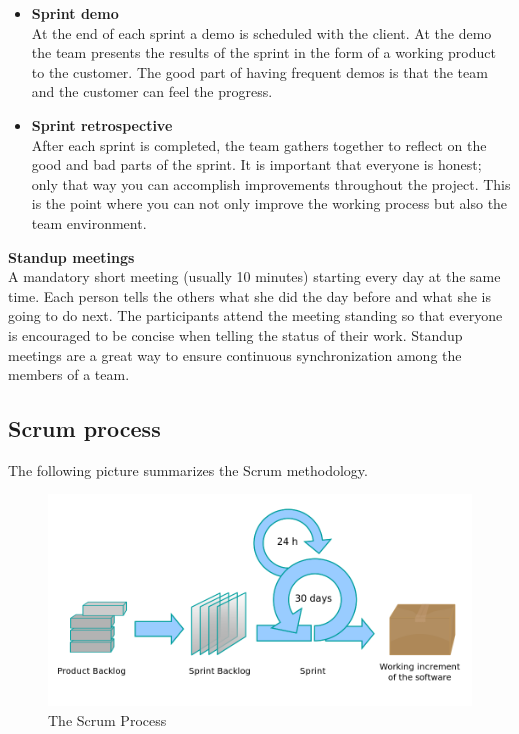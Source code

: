 \begin{itemize}
\item{\textbf{Sprint demo}}\\
At the end of each sprint a demo is scheduled with the client. At the demo the team presents the results of the sprint 
in the form of a working product to the customer. The good part of having frequent demos is that the team and the customer can
feel the progress. 

\item{\textbf{Sprint retrospective}}\\
After each sprint is completed, the team gathers together to reflect on the good and bad parts of the sprint.
It is important that everyone is honest; only that way you can accomplish improvements throughout the project.
This is the point where you can not only improve the working process but also the team environment.
\end{itemize}

\item{\textbf{Standup meetings}}\\
A mandatory short meeting (usually 10 minutes) starting every day at the same time.
Each person tells the others what she did the day before and what she is going to do
next. The participants attend the meeting standing so that everyone is encouraged to be concise
when telling the status of their work. Standup meetings are a great way to ensure continuous
synchronization among the members of a team.

\pagebreak

\subsection{Scrum process}
The following picture summarizes the Scrum methodology.

\begin{figure}[!h]
\centering
\includegraphics[scale=0.35]{graphics/scrum.png}
\caption{The Scrum Process}\label{fig:scrum_process}
\end{figure}
